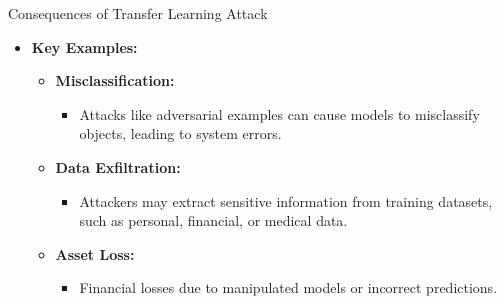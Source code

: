 \begin{frame}{Consequences of Transfer Learning Attack}
    \begin{itemize}
        \item \textbf{Key Examples:}
        \begin{itemize}
            \item \textbf{Misclassification:} 
            \begin{itemize}
                \item Attacks like adversarial examples can cause models to misclassify objects, leading to system errors.
            \end{itemize}
            \item \textbf{Data Exfiltration:} 
            \begin{itemize}
                \item Attackers may extract sensitive information from training datasets, such as personal, financial, or medical data.
            \end{itemize}
            \item \textbf{Asset Loss:} 
            \begin{itemize}
                \item Financial losses due to manipulated models or incorrect predictions.
            \end{itemize}
        \end{itemize}
    \end{itemize}


\end{frame}
